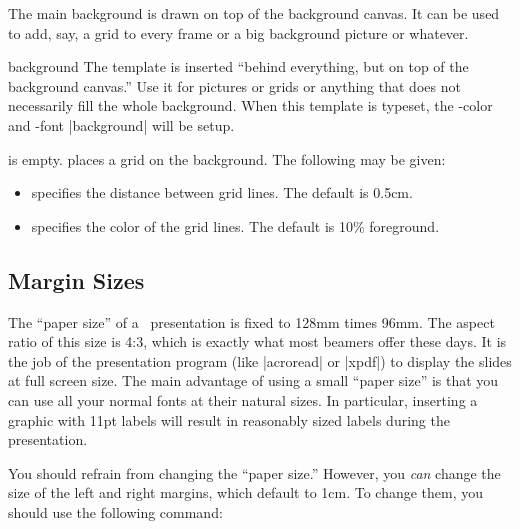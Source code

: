 The main background is drawn on top of the background canvas. It can
be used to add, say, a grid to every frame or a big background picture
or whatever.

\begin{template}{background}
  The template is inserted ``behind everything, but on top of the
  background canvas.'' Use it for pictures or grids or anything that
  does not necessarily fill the whole background. When this template
  is typeset, the \beamer-color and -font |background| will be
  setup.

  \begin{templateoptions}
     is empty.
    places a grid on the background. The following
     may be given:
    \begin{itemize}
    \item {} specifies the distance
      between grid lines. The default is 0.5cm.
    \item {} specifies the color of the
      grid lines. The default is 10\% foreground.
    \end{itemize}
  \end{templateoptions}  
\end{template}




\subsection{Margin Sizes}

The ``paper size'' of a \beamer\ presentation is fixed to 128mm times
96mm. The aspect ratio of this size is 4:3, which is exactly what most
beamers offer these days. It is the job of the
presentation program (like |acroread| or |xpdf|) to display the slides
at full screen size. The main advantage of using a small ``paper size''
is that you can use all your normal fonts at their natural sizes. In
particular, inserting a graphic with 11pt labels will result in
reasonably sized labels during the presentation.

You should refrain from changing the ``paper size.'' However, you
\emph{can} change the size of the left and right margins, which
default to 1cm. To change them, you should use the following 
command:

